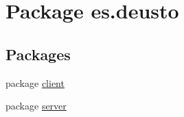 \hypertarget{namespacees_1_1deusto}{}\section{Package es.\+deusto}
\label{namespacees_1_1deusto}
\subsection*{Packages}
\begin{DoxyCompactItemize}
\item 
package \mbox{\hyperlink{namespacees_1_1deusto_1_1client}{client}}
\item 
package \mbox{\hyperlink{namespacees_1_1deusto_1_1server}{server}}
\end{DoxyCompactItemize}
